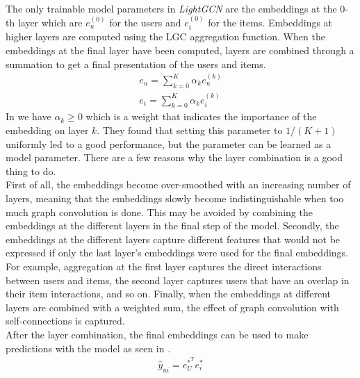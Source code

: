 \\
The only trainable model parameters in \textit{LightGCN} are the embeddings at the 0-th layer which are $e_{u}^{(0)}$ for the users and $e_{i}^{(0)}$ for the items.
Embeddings at higher layers are computed using the LGC aggregation function. 
When the embeddings at the final layer have been computed, layers are combined through a summation to get a final presentation of the users and items.
\begin{align}\label{eqn:lgcn-layer-comb}
    e_{u} = \sum_{k=0}^K \alpha_k e_{u}^{(k)} \nonumber\\
    e_{i} = \sum_{k=0}^K \alpha_k e_{i}^{(k)}
\end{align}
In  we have $\alpha_k \geq 0$ which is a weight that indicates the importance of the embedding on layer $k$.
They found that setting this parameter to $1/(K+1)$ uniformly led to a good performance, but the parameter can be learned as a model parameter.
There are a few reasons why the layer combination is a good thing to do.
\\
First of all, the embeddings become over-smoothed with an increasing number of layers, meaning that the embeddings slowly become indistinguishable when too much graph convolution is done.
This may be avoided by combining the embeddings at the different layers in the final step of the model.
Secondly, the embeddings at the different layers capture different features that would not be expressed if only the last layer's embeddings were used for the final embeddings.
For example, aggregation at the first layer captures the direct interactions between users and items, the second layer captures users that have an overlap in their item interactions, and so on.
Finally, when the embeddings at different layers are combined with a weighted sum, the effect of graph convolution with self-connections is captured.
\\
After the layer combination, the final embeddings can be used to make predictions with the model as seen in .
\begin{align}\label{eqn:lgcn-pred}
    \hat{y}_{ui} = e_U^{*^\textrm{T}} e_i^*
\end{align}
